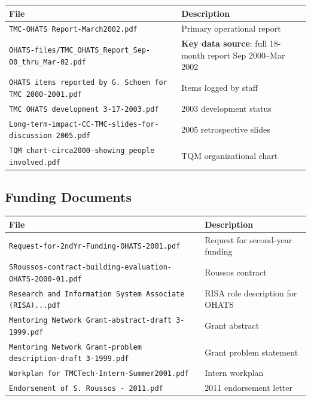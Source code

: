\documentclass[12pt]{article}
\begin{document}
\begin{center}
\begin{tabular}{lp{9cm}}
\toprule
File & Description \\
\midrule
\texttt{TMC-OHATS Report-March2002.pdf} & Primary operational report \\
\texttt{OHATS-files/TMC\_OHATS\_Report\_Sep-00\_thru\_Mar-02.pdf} & \textbf{Key data source}: full 18-month report Sep 2000--Mar 2002 \\
\texttt{OHATS items reported by G.~Schoen for TMC 2000-2001.pdf} & Items logged by staff \\
\texttt{TMC OHATS development 3-17-2003.pdf} & 2003 development status \\
\texttt{Long-term-impact-CC-TMC-slides-for-discussion~2005.pdf} & 2005 retrospective slides \\
\texttt{TQM chart-circa2000-showing people involved.pdf} & TQM organizational chart \\
\bottomrule
\end{tabular}
\end{center}

\subsection{Funding Documents}

\begin{center}
\begin{tabular}{lp{9cm}}
\toprule
File & Description \\
\midrule
\texttt{Request-for-2ndYr-Funding-OHATS-2001.pdf} & Request for second-year funding \\
\texttt{SRoussos-contract-building-evaluation-OHATS-2000-01.pdf} & Roussos contract \\
\texttt{Research and Information System Associate (RISA)...pdf} & RISA role description for OHATS \\
\texttt{Mentoring Network Grant-abstract-draft~3-1999.pdf} & Grant abstract \\
\texttt{Mentoring Network Grant-problem description-draft~3-1999.pdf} & Grant problem statement \\
\texttt{Workplan for TMCTech-Intern-Summer2001.pdf} & Intern workplan \\
\texttt{Endorsement of S.~Roussos - 2011.pdf} & 2011 endorsement letter \\
\bottomrule
\end{tabular}
\end{center}
\end{document}
